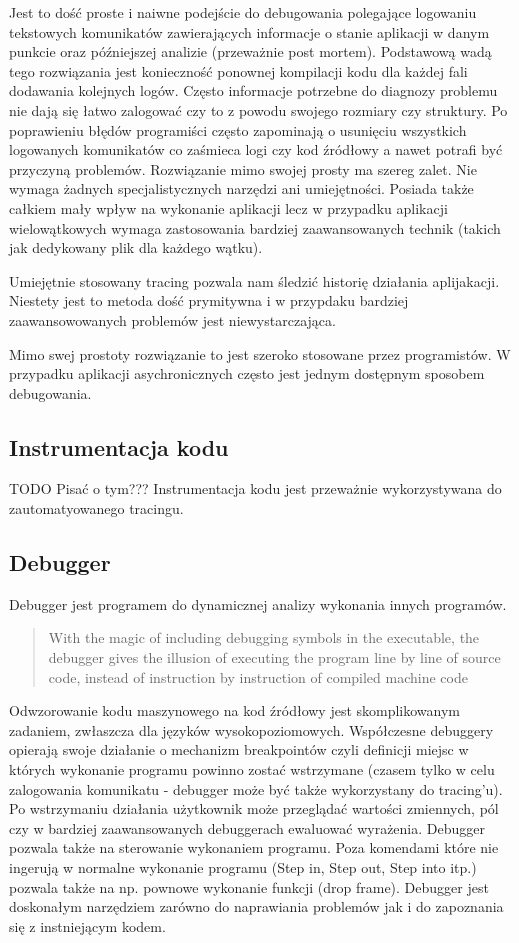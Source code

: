 Jest to dość proste i naiwne podejście do debugowania polegające logowaniu tekstowych komunikatów zawierających informacje o stanie aplikacji w danym punkcie oraz późniejszej analizie (przeważnie post mortem). Podstawową wadą tego rozwiązania jest konieczność ponownej kompilacji kodu dla każdej fali dodawania kolejnych logów. Często informacje potrzebne do diagnozy problemu nie dają się łatwo zalogować czy to z powodu swojego rozmiary czy struktury. Po poprawieniu błędów programiści często zapominają o usunięciu wszystkich logowanych komunikatów co zaśmieca logi czy kod źródłowy a nawet potrafi być przyczyną problemów.
Rozwiązanie mimo swojej prosty ma szereg zalet. Nie wymaga żadnych specjalistycznych narzędzi ani umiejętności. Posiada także całkiem mały wpływ na wykonanie aplikacji lecz w przypadku aplikacji wielowątkowych wymaga zastosowania bardziej zaawansowanych technik (takich jak dedykowany plik dla każdego wątku).

Umiejętnie stosowany tracing pozwala nam śledzić historię działania aplijakacji. Niestety jest to metoda dość prymitywna i w przypdaku bardziej zaawansowowanych problemów jest niewystarczająca.
 
Mimo swej prostoty rozwiązanie to jest szeroko stosowane przez programistów. W przypadku aplikacji asychronicznych często jest jednym dostępnym sposobem debugowania. 

\subsection{Instrumentacja kodu}

TODO Pisać o tym???
Instrumentacja kodu jest przeważnie wykorzystywana do zautomatyowanego tracingu.

\subsection{Debugger}
Debugger jest programem do dynamicznej analizy wykonania innych programów. 
\begin{quote}
    With the magic of including debugging symbols in the executable, the debugger gives the illusion of executing the program line by line of source code, instead of instruction by instruction of compiled machine code~\cite{artOfDebugging}
\end{quote}
Odwzorowanie kodu maszynowego na kod źródłowy jest skomplikowanym zadaniem, zwłaszcza dla języków wysokopoziomowych. Współczesne debuggery opierają swoje działanie o mechanizm breakpointów czyli definicji miejsc w których wykonanie programu powinno zostać wstrzymane (czasem tylko w celu zalogowania komunikatu - debugger może być także wykorzystany do tracing'u). Po wstrzymaniu działania użytkownik może przeglądać wartości zmiennych, pól czy w bardziej zaawansowanych debuggerach ewaluować wyrażenia.
Debugger pozwala także na sterowanie wykonaniem programu. Poza komendami które nie ingerują w normalne wykonanie programu (Step in, Step out, Step into itp.) pozwala także na np. pownowe wykonanie funkcji (drop frame). Debugger jest doskonałym narzędziem zarówno do naprawiania problemów jak i do zapoznania się z instniejącym kodem.



